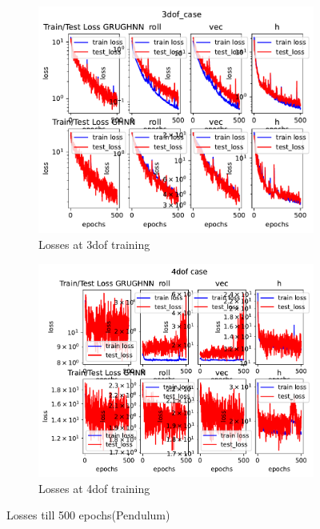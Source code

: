 \begin{figure}[H]
	\centering
	\begin{subfigure}[b]{0.4\textwidth}
		\centering
		\includegraphics[width=\textwidth]{chapters/chapter5/loss_3dof.pdf}
		\caption{Losses at 3dof training}
	\end{subfigure}
	\hfill
	\begin{subfigure}[b]{0.4\textwidth}
		\centering
		\includegraphics[width=\textwidth]{chapters/chapter5/loss_4dof.pdf}
		\caption{Losses at 4dof training}
	\end{subfigure}
	
	
	\caption{Losses till 500 epochs(Pendulum)}
	\label{fig_traj}
\end{figure}
